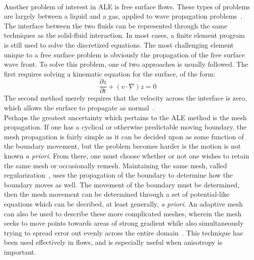 \documentclass{article}
\def\pp#1#2{\frac{\partial #1}{\partial #2}}
\begin{document}
\\
Another problem of interest in ALE is free surface flows.  These types of problems are largely between a liquid and a gas, applied to wave propagation problems~\cite{braess00,lo04,nithiarasu05}.  The interface between the two fluids can be represented through the same techniques as the solid-fluid interaction.  In most cases, a finite element program is still used to solve the discretized equations.  The most challenging element unique to a free surface problem is obviously the propagation of the free surface wave front.  To solve this problem, one of two approaches is usually followed.  The first requires solving a kinematic equation for the surface, of the form:
\begin{equation}
  \pp{z}{t} + (v\cdot \nabla)z = 0
\end{equation}
The second method merely requires that the velocity across the interface is zero, which allows the surface to propagate as normal~\cite{sarrate01}.
\\
Perhaps the greatest uncertainty which pertains to the ALE method is the mesh propagation.  If one has a cyclical or otherwise predictable moving boundary, the mesh propagation is fairly simple as it can be decided upon as some function of the boundary movement, but the problem becomes harder is the motion is not known \emph{a priori}.  From there, one must choose whether or not one wishes to retain the same mesh or occasionally remesh.  Maintaining the same mesh, called regularization~\cite{sarrate01}, uses the propagation of the boundary to determine how the boundary moves as well.  The movement of the boundary must be determined, then the mesh movement can be determined through a set of potential-like equations which can be decribed, at least generally, \emph{a priori}.  An adaptive mesh can also be used to describe these more complicated meshes, wherein the mesh seeks to move points towards areas of strong gradient while also simultaneously trying to spread error out evenly across the entire domain~\cite{sarrate01}.  This technique has been used effectively in flows, and is especially useful when anisotropy is important.
\\
\end{document}
